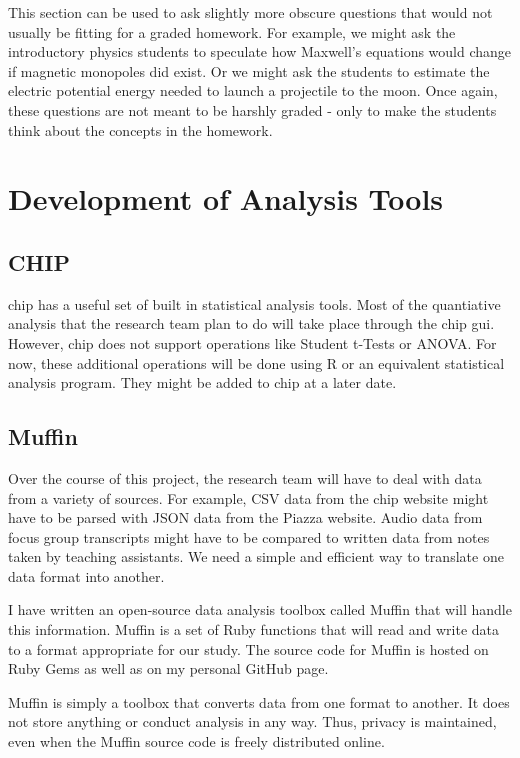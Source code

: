 This section can be used to ask slightly more obscure questions that would not usually be fitting for a graded homework. For example, we might ask the introductory physics students to speculate how Maxwell's equations would change if magnetic monopoles did exist. Or we might ask the students to estimate the electric potential energy needed to launch a projectile to the moon. Once again, these questions are not meant to be harshly graded - only to make the students think about the concepts in the homework.

\section{Development of Analysis Tools}

\subsection{CHIP}

\gls{chip} has a useful set of built in statistical analysis tools. Most of the quantiative analysis that the research team plan to do will take place through the \gls{chip} \gls{gui}. However, \gls{chip} does not support operations like Student t-Tests or ANOVA. For now, these additional operations will be done using R or an equivalent statistical analysis program. They might be added to \gls{chip} at a later date.

\subsection{Muffin}

Over the course of this project, the research team will have to deal with data from a variety of sources. For example, CSV data from the \gls{chip} website might have to be parsed with JSON data from the Piazza website. Audio data from focus group transcripts might have to be compared to written data from notes taken by teaching assistants. We need a simple and efficient way to translate one data format into another.

I have written an open-source data analysis toolbox called Muffin that will handle this information. Muffin is a set of Ruby functions that will read and write data to a format appropriate for our study. The source code for Muffin is hosted on Ruby Gems as well as on my personal GitHub page.

Muffin is simply a toolbox that converts data from one format to another. It does not store anything or conduct analysis in any way. Thus, privacy is maintained, even when the Muffin source code is freely distributed online.

